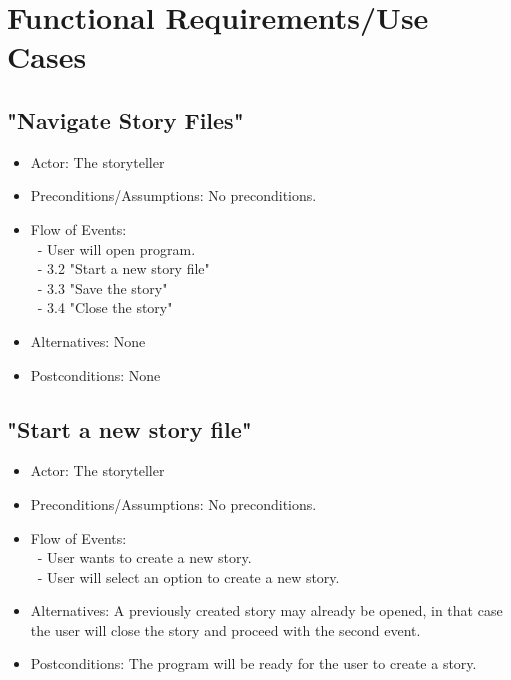\documentclass[12pt]{article}
\begin{document}
\section{Functional Requirements/Use Cases}
\subsection{"Navigate Story Files"}
\begin{itemize}
	\item Actor: The storyteller 
	\item Preconditions/Assumptions: No preconditions.
	\item Flow of Events: \\
	 	\ - User will open program. \\
		\ - 3.2 "Start a new story file" \\
		\ - 3.3 "Save the story" \\
		\ - 3.4 "Close the story"
	\item Alternatives: None
	\item Postconditions: None
\end{itemize}

	\subsection{"Start a new story file"}
\begin{itemize}
	\item Actor: The storyteller 
	\item Preconditions/Assumptions: No preconditions.
	\item Flow of Events: \\
		\ - User wants to create a new story. \\
		\ - User will select an option to create a new story.
	
	\item Alternatives: A previously created story may already be opened, in that case the user will close the story and proceed with the second event.
	\item Postconditions: The program will be ready for the user to create a story.
\end{itemize}

\end{document}
